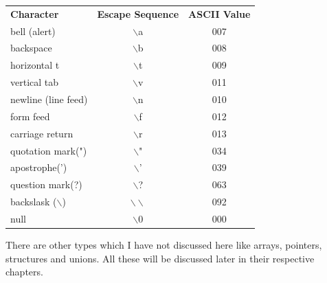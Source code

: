 \begin{table}[H]
\begin{center}
\caption{Escape Sequences}
\begin{longtable}{lcc}
\textbf{Character}&\textbf{Escape Sequence}&\textbf{ASCII Value}\\
bell (alert)&$\backslash$a&007\\
backspace&$\backslash$b&008\\
horizontal t&$\backslash$t&009\\
vertical tab&$\backslash$v&011\\
newline (line feed)&$\backslash$n&010\\
form feed&$\backslash$f&012\\
carriage return&$\backslash$r&013\\
quotation mark(")&$\backslash$"&034\\
apostrophe(')&$\backslash$'&039\\
question mark(?)&$\backslash$?&063\\
backslask ($\backslash$)&$\backslash\backslash$&092\\
null&$\backslash$0&000
\end{longtable}
\end{center}
\end{table}

There are other types which I have not discussed here like arrays, pointers,
structures and unions. All these will be discussed later in their respective
chapters.
